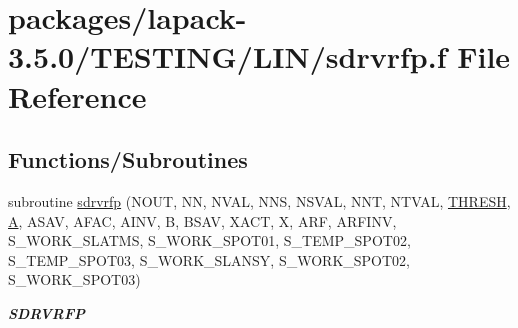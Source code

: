 \hypertarget{sdrvrfp_8f}{}\section{packages/lapack-\/3.5.0/\+T\+E\+S\+T\+I\+N\+G/\+L\+I\+N/sdrvrfp.f File Reference}
\label{sdrvrfp_8f}
\subsection*{Functions/\+Subroutines}
\begin{DoxyCompactItemize}
\item 
subroutine \hyperlink{group__single__lin_ga56f8e2c079ad864fbc239f3f1d055174}{sdrvrfp} (N\+O\+U\+T, N\+N, N\+V\+A\+L, N\+N\+S, N\+S\+V\+A\+L, N\+N\+T, N\+T\+V\+A\+L, \hyperlink{zlaqgs_8c_a0656018abfc9fa2821827415f5d5ea57}{T\+H\+R\+E\+S\+H}, \hyperlink{classA}{A}, A\+S\+A\+V, A\+F\+A\+C, A\+I\+N\+V, B, B\+S\+A\+V, X\+A\+C\+T, X, A\+R\+F, A\+R\+F\+I\+N\+V, S\+\_\+\+W\+O\+R\+K\+\_\+\+S\+L\+A\+T\+M\+S, S\+\_\+\+W\+O\+R\+K\+\_\+\+S\+P\+O\+T01, S\+\_\+\+T\+E\+M\+P\+\_\+\+S\+P\+O\+T02, S\+\_\+\+T\+E\+M\+P\+\_\+\+S\+P\+O\+T03, S\+\_\+\+W\+O\+R\+K\+\_\+\+S\+L\+A\+N\+S\+Y, S\+\_\+\+W\+O\+R\+K\+\_\+\+S\+P\+O\+T02, S\+\_\+\+W\+O\+R\+K\+\_\+\+S\+P\+O\+T03)
\begin{DoxyCompactList}\small\item\em {\bfseries S\+D\+R\+V\+R\+F\+P} \end{DoxyCompactList}\end{DoxyCompactItemize}
